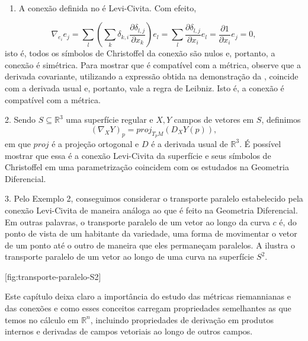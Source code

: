 \begin{examples}
	\label{ex:levi-civita-transporte-paralelo}
	$ $
	\begin{enumerate}
		\item A conexão definida no  é Levi-Civita. Com efeito,
	\end{enumerate}
	\begin{equation*}
		\nabla_{e_{i}}e_{j}=\sum_{l}\left( \sum_{k}\delta_{k,i}\frac{\partial\delta_{l,j}}{\partial x_{k}} \right)e_{l} = \sum_{l}\frac{\partial\delta_{l,j}}{\partial x_{i}}e_{l}=\frac{\partial1}{\partial x_{i}}e_{j}=0,
	\end{equation*}
	isto é, todos os símbolos de Christoffel da conexão são nulos e, portanto, a conexão é simétrica. Para mostrar que é compatível com a métrica, observe que a derivada covariante, utilizando a expressão obtida na demonstração da , coincide com a derivada usual e, portanto, vale a regra de Leibniz. Isto é, a conexão é compatível com a métrica.

	2. Sendo $S \subseteq \mathbb{R}^{3}$ uma superfície regular e $X,Y$ campos de vetores em $S$, definimos
	\begin{equation*}
		(\nabla_{X}Y)_{p}=proj_{T_{p}M}(D_{X}Y(p)),
	\end{equation*}
	em que $proj$ é a projeção ortogonal e $D$ é a derivada usual de $\mathbb{R}^{3}$. É possível mostrar que essa é a conexão Levi-Civita da superfície e seus símbolos de Christoffel em uma parametrização coincidem com os estudados na Geometria Diferencial.

	3. Pelo Exemplo 2, conseguimos considerar o transporte paralelo estabelecido pela conexão Levi-Civita de maneira análoga ao que é feito na Geometria Diferencial. Em outras palavras, o transporte paralelo de um vetor ao longo da curva $c$ é, do ponto de vista de um habitante da variedade, uma forma de movimentar o vetor de um ponto até o outro de maneira que eles permaneçam paralelos. A  ilustra o transporte paralelo de um vetor ao longo de uma curva na superfície $S^{2}$.

	[fig:transporte-paralelo-S2]
\end{examples}
Este capítulo deixa claro a importância do estudo das métricas riemannianas e das conexões e como esses conceitos carregam propriedades semelhantes as que temos no cálculo em $\mathbb{R}^{n}$, incluindo propriedades de derivação em produtos internos e derivadas de campos vetoriais ao longo de outros campos.
